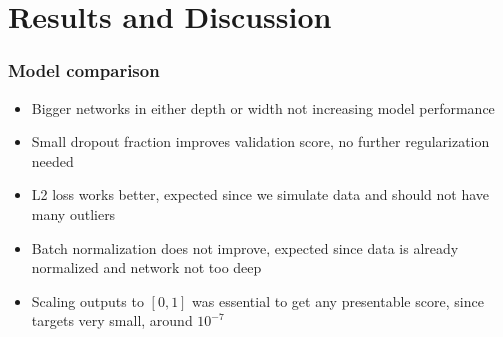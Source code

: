 \documentclass{beamer}
\begin{document}
\section{Results and Discussion}

\begin{frame}
\frametitle{Model comparison}
\begin{itemize}
\item<1->Bigger networks in either depth or width not increasing model performance
\item<2->Small dropout fraction improves validation score, no further regularization needed
\item<3->L2 loss works better, expected since we simulate data and should not have many outliers
\item<4->Batch normalization does not improve, expected since data is already normalized and network not too deep
\item<5->Scaling outputs to $[0,1]$ was essential to get any presentable score, since targets very small, around $10^{-7}$
\end{itemize}
\end{frame}
\end{document}
